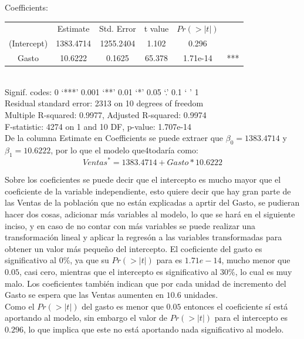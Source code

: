 \documentclass[12pt,a4paper]{article}
\begin{document}
	Coefficients:\\

	\begin{tabular}{cccccc}
		 &     Estimate & Std. Error&     t value&   $Pr(>|t|)$&\\
		(Intercept) & 1383.4714 & 1255.2404 &  1.102  &  0.296&\\
		 Gasto      &   10.6222 &   0.1625  & 65.378  & 1.71e-14 &***\\
	\end{tabular}\\
	
	Signif. codes:  0 ‘***’ 0.001 ‘**’ 0.01 ‘*’ 0.05 ‘.’ 0.1 ‘ ’ 1\\
	
	Residual standard error: 2313 on 10 degrees of freedom\\
	
	Multiple R-squared:  0.9977,	Adjusted R-squared:  0.9974\\ 
	
	F-statistic:  4274 on 1 and 10 DF,  p-value: 1.707e-14\\
	
	
	De la columna Estimate en Coefficients se puede extraer que $\beta_0=1383.4714$ y $\beta_1=10.6222$, por lo que el modelo que4todaría como:
	\begin{equation*}
	{Ventas}^{*} = 1383.4714 + Gasto * 10.6222
	\end{equation*}
	
	Sobre los coeficientes se puede decir que el intercepto es mucho mayor que el coeficiente de la variable independiente, esto quiere decir que hay gran parte de las Ventas de la población que no están explicadas a aprtir del Gasto, se pudieran hacer dos cosas, adicionar más variables al modelo, lo que se hará en el siguiente inciso, y en caso de no contar con más variables se puede realizar una transformación lineal y aplicar la regresón a las variables transformadas para obtener un valor más pequeño del intercepto. 
	El coeficiente del gasto es significativo al $0\%$, ya que su $Pr(>|t|)$ para es $1.71e-14$, mucho menor que $0.05$, casi cero, mientras que el intercepto es significativo al $30\%$, lo cual es muy malo. Los coeficientes también indican que por cada unidad de incremento del Gasto se espera que las Ventas aumenten en $10.6$ unidades.\\
	
	Como el $Pr(>|t|)$ del gasto es menor que $0.05$ entonces el coeficiente sí está aportando al modelo, sin embargo el valor de $Pr(>|t|)$ para el intercepto es $0.296$, lo que implica que este no está aportando nada significativo al modelo.\\
	
\end{document}
